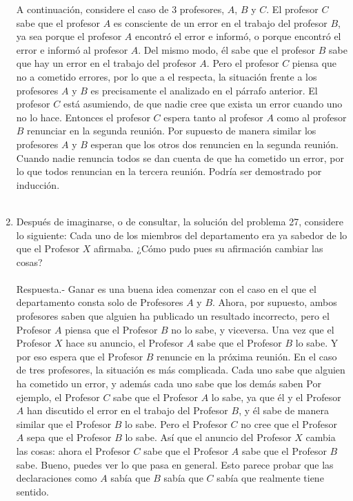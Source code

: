 \begin{enumerate}[\bfseries 1.]
	  A continuación, considere el caso de 3 profesores, $A$, $B$ y $C$. El profesor $C$ sabe que el profesor $A$ es consciente de un error en el trabajo del profesor $B$, ya sea porque el profesor $A$ encontró el error e informó, o porque encontró el error e informó al profesor $A$. Del mismo modo, él sabe que el profesor $B$ sabe que hay un error en el trabajo del profesor $A$. Pero el profesor $C$ piensa que no a cometido errores, por lo que a el respecta, la situación frente a los profesores $A$ y $B$ es precisamente el analizado en el párrafo anterior. El profesor $C$ está asumiendo, de que nadie cree que exista un error cuando uno no lo hace. Entonces el profesor $C$ espera tanto al profesor $A$ como al profesor $B$ renunciar en la segunda reunión. Por supuesto de manera similar los profesores $A$ y $B$ esperan que los otros dos renuncien en la segunda reunión. Cuando nadie renuncia todos se dan cuenta de que ha cometido un error, por lo que todos renuncian en la tercera reunión. Podría ser demostrado por inducción.\\\\ 

       \item Después de imaginarse, o de consultar, la solución del problema 27, considere lo siguiente: Cada uno de los miembros del departamento era ya sabedor de lo que el Profesor $X$ afirmaba. ¿Cómo pudo pues su afirmación cambiar las cosas?\\\\
          Respuesta.-\; Ganar es una buena idea comenzar con el caso en el que el departamento consta solo de Profesores $A$ y $B$. Ahora, por supuesto, ambos profesores saben que alguien ha publicado un resultado incorrecto, pero el Profesor $A$ piensa que el Profesor $B$ no lo sabe, y viceversa. Una vez que el Profesor $X$ hace su anuncio, el Profesor $A$ sabe que el Profesor $B$ lo sabe. Y por eso espera que el Profesor $B$ renuncie en la próxima reunión. En el caso de tres profesores, la situación es más complicada. Cada uno sabe que alguien ha cometido un error, y además cada uno sabe que los demás saben Por ejemplo, el Profesor $C$ sabe que el Profesor $A$ lo sabe, ya que él y el Profesor $A$ han discutido el error en el trabajo del Profesor $B$, y él sabe de manera similar que el Profesor $B$ lo sabe. Pero el Profesor $C$ no cree que el Profesor $A$ sepa que el Profesor $B$ lo sabe. Así que el anuncio del Profesor $X$ cambia las cosas: ahora el Profesor $C$ sabe que el Profesor $A$ sabe que el Profesor $B$ sabe. Bueno, puedes ver lo que pasa en general. Esto parece probar que las declaraciones como $A$ sabía que $B$ sabía que $C$ sabía que realmente tiene sentido.\\\\


    \end{enumerate}
    

